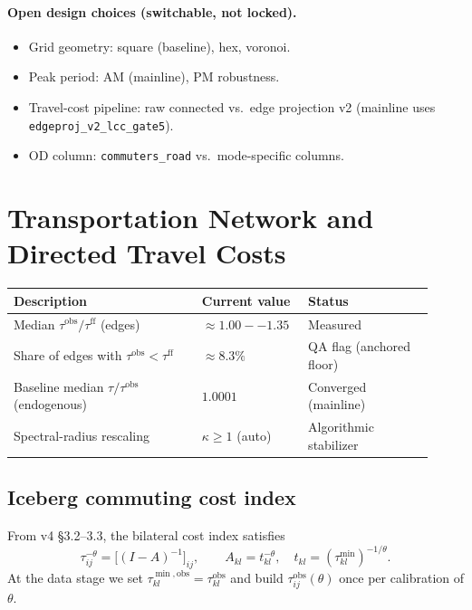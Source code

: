 \documentclass[11pt]{article}
\newcommand{\obs}{\mathrm{obs}}
\begin{document}
\paragraph{Open design choices (switchable, not locked).}
\begin{itemize}[leftmargin=2em]
  \item Grid geometry: square (baseline), hex, voronoi.
  \item Peak period: AM (mainline), PM robustness.
  \item Travel-cost pipeline: raw connected vs.\ edge projection v2
        (mainline uses \texttt{edgeproj\_v2\_lcc\_gate5}).
  \item OD column: \texttt{commuters\_road} vs.\ mode-specific columns.
\end{itemize}

\section{Transportation Network and Directed Travel Costs}\label{sec:transport}

\begin{longtable}{@{}p{0.42\linewidth}p{0.22\linewidth}p{0.28\linewidth}@{}}
\toprule
\textbf{Description} & \textbf{Current value} & \textbf{Status} \\
\midrule
\endhead
Median $\tau^{\obs}/\tau^{\mathrm{ff}}$ (edges) & $\approx 1.00--1.35$ & Measured \\
Share of edges with $\tau^{\obs}<\tau^{\mathrm{ff}}$ & $\approx 8.3\%$ & QA flag (anchored floor) \\
Baseline median $\tau/\tau^{\obs}$ (endogenous) & $1.0001$ & Converged (mainline) \\
Spectral-radius rescaling & $\kappa\ge 1$ (auto) & Algorithmic stabilizer \\
\bottomrule
\end{longtable}

\subsection{Iceberg commuting cost index}

From v4 \S3.2--3.3, the bilateral cost index satisfies
\begin{equation}\label{eq:tau_series}
  \tau_{ij}^{-\theta} = \bigl[(I-A)^{-1}\bigr]_{ij},
  \qquad
  A_{kl} = t_{kl}^{-\theta},\quad
  t_{kl} = (\tau^{\min}_{kl})^{-1/\theta}.
\end{equation}
At the data stage we set $\tau^{\min,\obs}_{kl}=\tau^{\obs}_{kl}$ and
build $\tau^{\obs}_{ij}(\theta)$ once per calibration of $\theta$.
\end{document}
